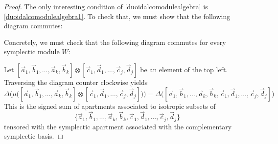 \documentclass[11pt,letterpaper]{amsart}
\newcommand{\PP}{\mathfrak{P}}
\newcommand{\LL}{\mathfrak{L}}
\numberwithin{theoremcounter}{section}
\theoremstyle{definition}
\theoremstyle{remark}
\DeclareMathOperator{\St}{St}
\begin{document}
\begin{proof}
The only interesting condition of \autoref{duoidalcomodulealgebra} is \autoref{duoidalcomodulealgebra1}. To check that, we must show  that the following diagram commutes:  
\begin{center}   
    \end{center} 
Concretely, we must check that the following diagram commutes for every symplectic module $W$:

\begin{center}   
    \end{center}
    Let $[\vec a_1,\vec b_1,\ldots,\vec a_k,\vec b_k] \otimes [\vec c_1,\vec d_1,\ldots,\vec c_j,\vec d_j]$ be an element of the top left. Traversing the diagram counter clockwise yields $$\Delta\Big(\mu\Big([\vec a_1,\vec b_1,\ldots,\vec a_k,\vec b_k] \otimes [\vec c_1,\vec d_1,\ldots,\vec c_j,\vec d_j]\Big)\Big)=\Delta\Big([\vec a_1,\vec b_1,\ldots,\vec a_k,\vec b_k,\vec c_1,\vec d_1,\ldots,\vec c_j,\vec d_j]\Big)$$
This is the signed sum of apartments associated to isotropic subsets of $$\{\vec a_1,\vec b_1,\ldots,\vec a_k,\vec b_k,\vec c_1,\vec d_1,\ldots,\vec c_j,\vec d_j\}$$ tensored with the symplectic apartment associated with the complementary symplectic basis. 


\end{proof}
\end{document}
